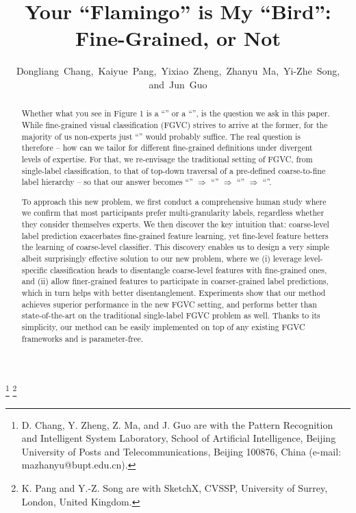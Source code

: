 \documentclass[final]{cvpr}
\begin{document}
\title{Your ``Flamingo'' is My ``Bird'': Fine-Grained, or Not}

\author{Dongliang~Chang,~Kaiyue~Pang,~Yixiao~Zheng,~Zhanyu~Ma,~Yi-Zhe~Song, and~Jun~Guo}  




\maketitle


\begin{abstract}
Whether what you see in Figure 1 is a ``'' or a ``'', is the question we ask in this paper. While fine-grained visual classification (FGVC) strives to arrive at the former, for the majority of us non-experts just ``'' would probably suffice. The real question is therefore -- how can we tailor for different fine-grained definitions under divergent levels of expertise. For that, we re-envisage the traditional setting of FGVC, from single-label classification, to that of top-down traversal of a pre-defined coarse-to-fine label hierarchy -- so that our answer becomes ``'' 
$\Rightarrow$ 
``'' 
$\Rightarrow$ 
``''
$\Rightarrow$
``''. 

To approach this new problem, we first conduct a comprehensive human study where we confirm that most participants prefer multi-granularity labels, regardless whether they consider themselves experts. We then discover the key intuition that: coarse-level label prediction exacerbates fine-grained feature learning, yet fine-level feature betters the learning of coarse-level classifier. This discovery enables us to design a very simple albeit surprisingly effective solution to our new problem, where we (i) leverage level-specific classification heads to disentangle coarse-level features with fine-grained ones, and (ii) allow finer-grained features to participate in coarser-grained label predictions, which in turn helps with better disentanglement. Experiments show that our method achieves superior performance in the new FGVC setting, and performs better than state-of-the-art on the traditional single-label FGVC problem as well. Thanks to its simplicity, our method can be easily implemented on top of any existing FGVC frameworks and is parameter-free. 

\end{abstract}

\footnote{D. Chang, Y. Zheng, Z. Ma, and J. Guo are with the Pattern Recognition and Intelligent
System Laboratory, School of Artificial Intelligence, Beijing University of Posts and Telecommunications, Beijing 100876, China (e-mail: mazhanyu@bupt.edu.cn).}
\footnote{K. Pang and Y.-Z. Song  are with SketchX, CVSSP, University of Surrey, London, United Kingdom.}
\end{document}
